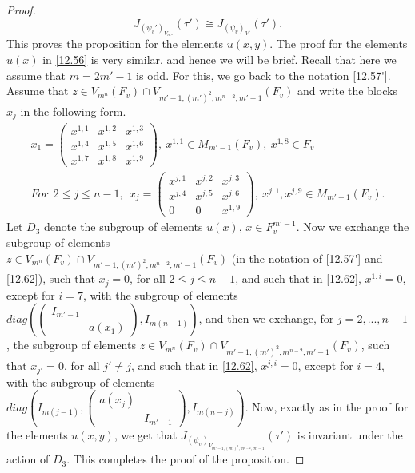 \documentclass[12pts]{amsart}
\begin{document}
\begin{proof}
\begin{equation}\label{12.57.6'}
J_{(\psi_v')_{V_{m^n}}}(\tau')\cong J_{(\psi_v)_{V'}}(\tau').
\end{equation}
This proves the proposition for the elements $u(x,y)$. The proof for the elements $u(x)$ in \eqref{12.56} is very similar, and hence we will be brief. Recall that here we assume that $m=2m'-1$ is odd.
For this, we go back to the notation \eqref{12.57'}. Assume that $z\in V_{m^n}(F_v)\cap V_{m'-1,(m')^2,m^{n-2},m'-1}(F_v)$  and write the blocks $x_j$ in the following form. 
\begin{multline}\label{12.62}
x_1=\begin{pmatrix}x^{1,1}&x^{1,2}&x^{1,3}\\x^{1,4}&x^{1,5}&x^{1,6}\\x^{1,7}&x^{1,8}&x^{1,9}\end{pmatrix},\ x^{1,1}\in M_{m'-1}(F_v),\ x^{1,8}\in F_v\\
\textit{For}\ \ 2\leq j\leq n-1,\ \
x_j=\begin{pmatrix}x^{j,1}&x^{j,2}&x^{j,3}\\x^{j,4}&x^{j,5}&x^{j,6}\\0&0&x^{1,9}\end{pmatrix},\ x^{j,1}, x^{j,9}\in M_{m'-1}(F_v).
\end{multline}
Let $D_3$ denote the subgroup of elements $u(x)$, $x\in F_v^{m'-1}$.
Now we exchange the subgroup of elements\\
$z\in V_{m^n}(F_v)\cap V_{m'-1,(m')^2,m^{n-2},m'-1}(F_v)$ (in the notation of \eqref{12.57'} and \eqref{12.62}), such that $x_j=0$, for all $2\leq j\leq n-1$, and such that in \eqref{12.62}, $x^{1,i}=0$, except for $i=7$, with the subgroup of elements
$diag(\begin{pmatrix}I_{m'-1}\\&a(x_1)\end{pmatrix},I_{m(n-1)})$, and then we exchange, for $j=2,...,n-1$, the subgroup of elements $z\in V_{m^n}(F_v)\cap V_{m'-1,(m')^2,m^{n-2},m'-1}(F_v)$, such that $x_{j'}=0$, for all $j'\neq j$, and such that in \eqref{12.62}, $x^{j,i}=0$, except for $i=4$, with the subgroup of elements\\
$diag(I_{m(j-1)},\begin{pmatrix}a(x_j)\\&I_{m'-1}\end{pmatrix},I_{m(n-j)})$. Now, exactly as in the proof for the elements $u(x,y)$, we get that	$J_{(\psi_v)_{V_{m'-1,(m')^2,m^{n-2},m'-1}}}(\tau')$ is invariant under the action of $D_3$. This completes the proof of the proposition.
	
\end{proof}
\end{document}
